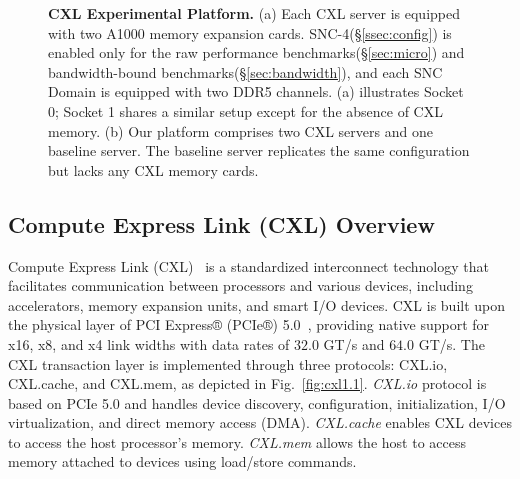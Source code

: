 \begin{figure}[t]
    \centering
    \caption[CXL Experimental Platform]{\textbf{CXL Experimental Platform.} (a) Each CXL server is equipped with two A1000 memory expansion cards. SNC-4(\S\ref{ssec:config}) is enabled only for the raw performance benchmarks(\S\ref{sec:micro}) and bandwidth-bound benchmarks(\S\ref{sec:bandwidth}), and each SNC Domain is equipped with two DDR5 channels. (a) illustrates Socket 0; Socket 1 shares a similar setup except for the absence of CXL memory. (b) Our platform comprises two CXL servers and one baseline server. The baseline server replicates the same configuration but lacks any CXL memory cards.}
\end{figure}

\subsection{Compute Express Link (CXL) Overview}

Compute Express Link (CXL)~\cite{sharma2022compute} is a standardized interconnect technology that facilitates communication between processors and various devices, including accelerators, memory expansion units, and smart I/O devices. CXL is built upon the physical layer of PCI Express® (PCIe®) 5.0~\cite{pcie5.0}, providing native support for x16, x8, and x4 link widths with data rates of $32.0$ GT/s and $64.0$ GT/s. The CXL transaction layer is implemented through three protocols: CXL.io, CXL.cache, and CXL.mem, as depicted in Fig.~\ref{fig:cxl1.1}. \textit{CXL.io} protocol is based on PCIe 5.0 and handles device discovery, configuration, initialization, I/O virtualization, and direct memory access (DMA). \textit{CXL.cache} enables CXL devices to access the host processor's memory. \textit{CXL.mem} allows the host to access memory attached to devices using load/store commands.

